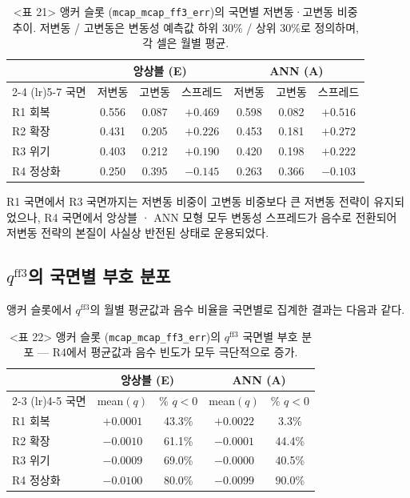 \documentclass{article}
\begin{document}
\begin{table}[ht]
\centering
\caption{<표 21> 앵커 슬롯 (\texttt{mcap\_mcap\_ff3\_err})의 국면별 저변동·고변동 비중 추이.
저변동 / 고변동은 변동성 예측값 하위 30\% / 상위 30\%로 정의하며, 각 셀은 월별 평균.}
\label{tab:r4_anchor_weights}
\setlength{\tabcolsep}{8pt}
\renewcommand{\arraystretch}{1.2}
\small
\begin{tabular}{lcccccc}
\toprule
& \multicolumn{3}{c}{앙상블 (E)} & \multicolumn{3}{c}{ANN (A)} \\
\cmidrule(lr){2-4} \cmidrule(lr){5-7}
국면 & 저변동 & 고변동 & 스프레드 & 저변동 & 고변동 & 스프레드 \\
\midrule
R1 회복   & 0.556 & 0.087 & $+0.469$          & 0.598 & 0.082 & $+0.516$          \\
R2 확장   & 0.431 & 0.205 & $+0.226$          & 0.453 & 0.181 & $+0.272$          \\
R3 위기   & 0.403 & 0.212 & $+0.190$          & 0.420 & 0.198 & $+0.222$          \\
R4 정상화 & 0.250 & 0.395 & $\mathbf{-0.145}$ & 0.263 & 0.366 & $\mathbf{-0.103}$ \\
\bottomrule
\end{tabular}
\end{table}

R1 국면에서 R3 국면까지는 저변동 비중이 고변동 비중보다 큰 저변동 전략이 유지되었으나, R4 국면에서 앙상블 · ANN 모형 모두 변동성 스프레드가 음수로 전환되어 저변동 전략의 본질이 사실상 반전된 상태로 운용되었다.

\subsection{$q^{\mathrm{ff3}}$의 국면별 부호 분포}

앵커 슬롯에서 $q^{\mathrm{ff3}}$의 월별 평균값과 음수 비율을 국면별로 집계한 결과는 다음과 같다.

\begin{table}[ht]
\centering
\caption{<표 22> 앵커 슬롯 (\texttt{mcap\_mcap\_ff3\_err})의 $q^{\mathrm{ff3}}$ 국면별 부호 분포 — R4에서 평균값과 음수 빈도가 모두 극단적으로 증가.}
\label{tab:r4_q_sign}
\setlength{\tabcolsep}{8pt}
\renewcommand{\arraystretch}{1.2}
\small
\begin{tabular}{lcccc}
\toprule
& \multicolumn{2}{c}{앙상블 (E)} & \multicolumn{2}{c}{ANN (A)} \\
\cmidrule(lr){2-3} \cmidrule(lr){4-5}
국면 & mean$(q)$ & \% $q<0$ & mean$(q)$ & \% $q<0$ \\
\midrule
R1 회복   & $+0.0001$          & 43.3\%            & $+0.0022$          & 3.3\%             \\
R2 확장   & $-0.0010$          & 61.1\%            & $-0.0001$          & 44.4\%            \\
R3 위기   & $-0.0009$          & 69.0\%            & $-0.0000$          & 40.5\%            \\
R4 정상화 & $\mathbf{-0.0100}$ & $\mathbf{80.0}$\% & $\mathbf{-0.0099}$ & $\mathbf{90.0}$\% \\
\bottomrule
\end{tabular}
\end{table}
\end{document}
